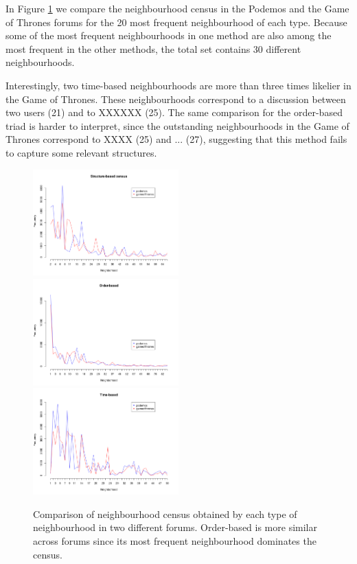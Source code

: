 \documentclass[conference]{IEEEtran}
\begin{document}
In Figure \ref{fig:census_compare} we compare the neighbourhood census in the Podemos and the Game of Thrones forums for the 20 most frequent neighbourhood of each type. Because some of the most frequent neighbourhoods in one method are also among the most frequent in the other methods, the total set contains 30 different neighbourhoods.

Interestingly, two time-based neighbourhoods are  more than three times likelier in the Game of Thrones. These neighbourhoods correspond to a discussion between two users (21) and to XXXXXX (25). The same comparison for the order-based triad is harder to interpret, since the outstanding neighbourhoods in the Game of Thrones correspond to XXXX (25) and ... (27), suggesting that this method fails to capture some relevant structures.

\begin{figure}
\centering
\includegraphics[width=0.5\textwidth]{structure_based_census}
\includegraphics[width=0.5\textwidth]{order_based_census}
\includegraphics[width=0.5\textwidth]{time_based_census}
\caption{Comparison of neighbourhood census obtained by each type of neighbourhood in two different forums. Order-based is more similar across forums since its most frequent neighbourhood dominates the census.}
\label{fig:census_compare}
\end{figure}
\end{document}
